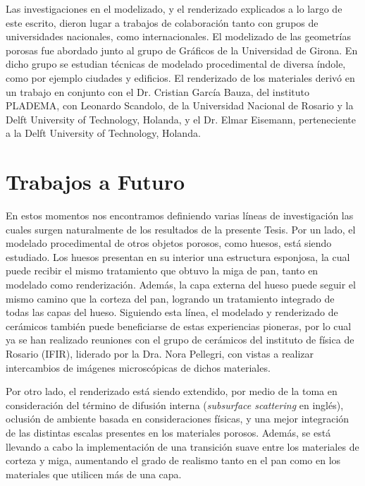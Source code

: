 Las investigaciones en el modelizado, y el renderizado explicados a lo largo de este escrito, dieron lugar a trabajos de colaboración tanto con grupos de universidades nacionales, como internacionales.
El modelizado de las geometrías porosas fue abordado junto al grupo de Gráficos de la Universidad de Girona.
En dicho grupo se estudian técnicas de modelado procedimental de diversa índole, como por ejemplo ciudades y edificios.
El renderizado de los materiales derivó en un trabajo en conjunto con el Dr. Cristian García Bauza, del instituto PLADEMA, con Leonardo Scandolo, de la Universidad Nacional de Rosario y la Delft University of Technology, Holanda, y el Dr. Elmar Eisemann, perteneciente a la Delft University of Technology, Holanda.



\section{Trabajos a Futuro}
En estos momentos nos encontramos definiendo varias líneas de investigación las cuales surgen naturalmente de los resultados de la presente Tesis.
Por un lado, el modelado procedimental de otros objetos porosos, como huesos, está siendo estudiado.
Los huesos presentan en su interior una estructura esponjosa, la cual puede recibir el mismo tratamiento que obtuvo la miga de pan, tanto en modelado como renderización.
Además, la capa externa del hueso puede seguir el mismo camino que la corteza del pan, logrando un tratamiento integrado de todas las capas del hueso.
Siguiendo esta línea, el modelado y renderizado de cerámicos también puede beneficiarse de estas experiencias pioneras, por lo cual ya se han realizado reuniones con el grupo de cerámicos del instituto de física de Rosario (IFIR), liderado por la Dra. Nora Pellegri, con vistas a realizar intercambios de imágenes microscópicas de dichos materiales.

Por otro lado, el renderizado está siendo extendido, por medio de la toma en consideración del término de difusión interna ({\em subsurface scattering} en inglés), oclusión de ambiente basada en consideraciones físicas, y una mejor integración de las distintas escalas presentes en los materiales porosos.
Además, se está llevando a cabo la implementación de una transición suave entre los materiales de corteza y miga, aumentando el grado de realismo tanto en el pan como en los materiales que utilicen más de una capa.

